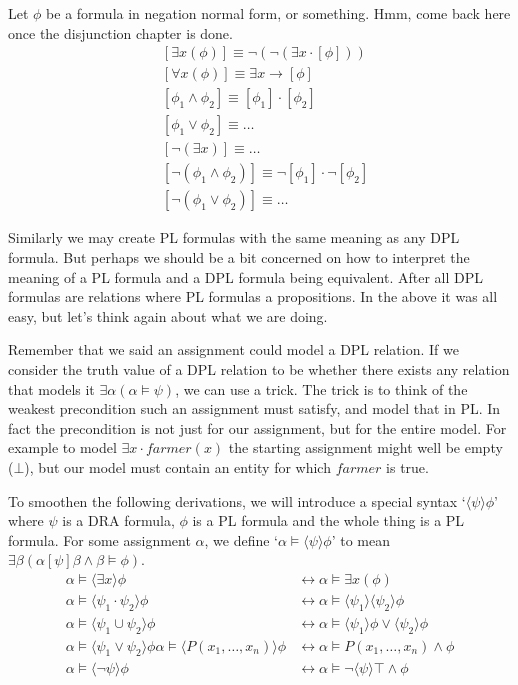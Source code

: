 \documentclass[12pt]{article}
\begin{document}
Let $\phi$ be a formula in negation normal form, or something. Hmm, come back here once the disjunction chapter is done.
\begin{align}
&[\exists x(\phi)] \equiv \neg(\neg(\exists x \cdot [\phi]))\\
&[\forall x(\phi)] \equiv \exists x \rightarrow [\phi]\\
&[\phi_1\wedge\phi_2] \equiv [\phi_1]\cdot[\phi_2]\\
&[\phi_1\vee\phi_2] \equiv \dots\\
&[\neg(\exists x)] \equiv \dots\\
&[\neg(\phi_1\wedge\phi_2)] \equiv \neg[\phi_1]\cdot\neg[\phi_2]\\
&[\neg(\phi_1\vee\phi_2)] \equiv \dots
\end{align}

Similarly we may create PL formulas with the same meaning as any DPL formula. But perhaps we should be a bit concerned on how to interpret the meaning of a PL formula and a DPL formula being equivalent. After all DPL formulas are relations where PL formulas a propositions. In the above it was all easy, but let's think again about what we are doing.

Remember that we said an assignment could model a DPL relation. If we consider the truth value of a DPL relation to be whether there exists any relation that models it $\exists\alpha(\alpha\models\psi)$, we can use a trick. The trick is to think of the weakest precondition such an assignment must satisfy, and model that in PL. In fact the precondition is not just for our assignment, but for the entire model. For example to model $\exists x\cdot farmer(x)$ the starting assignment might well be empty ($\bot$), but our model must contain an entity for which $farmer$ is true.

To smoothen the following derivations, we will introduce a special syntax `$\langle\psi\rangle\phi$' where $\psi$ is a DRA formula, $\phi$ is a PL formula and the whole thing is a PL formula. For some assignment $\alpha$, we define `$\alpha\models\langle\psi\rangle\phi$' to mean $\exists\beta(\alpha[\psi]\beta \wedge \beta\models\phi)$.
%
\begin{align}
\alpha\models\langle\exists x\rangle\phi
 & \leftrightarrow \alpha\models\exists x (\phi) \label{conv_exists}\\
\alpha\models\langle\psi_1\cdot\psi_2\rangle\phi
 & \leftrightarrow \alpha\models\langle\psi_1\rangle\langle\psi_2\rangle\phi \label{conv_and}\\
\alpha\models\langle\psi_1 \cup \psi_2\rangle\phi
 & \leftrightarrow \alpha\models\langle\psi_1\rangle\phi \vee \langle\psi_2\rangle\phi \label{conv_or}\\
 \alpha\models\langle\psi_1 \vee \psi_2\rangle\phi
\alpha\models\langle P(x_1,\dots,x_n)\rangle\phi
 & \leftrightarrow \alpha\models P(x_1,\dots,x_n) \wedge \phi \label{conv_pred}\\
\alpha\models\langle\neg\psi\rangle\phi
 & \leftrightarrow \alpha\models \neg\langle\psi\rangle\top \wedge \phi \label{conv_neg}
\end{align}
\end{document}
